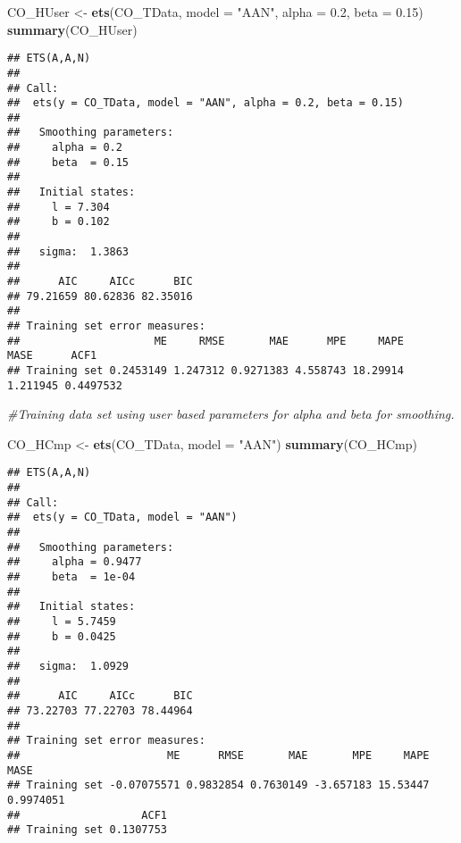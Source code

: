 \documentclass[
]{article}
\newenvironment{Shaded}{\begin{snugshade}}{\end{snugshade}}
\newcommand{\CommentTok}[1]{\textcolor[rgb]{0.56,0.35,0.01}{\textit{#1}}}
\newcommand{\DataTypeTok}[1]{\textcolor[rgb]{0.13,0.29,0.53}{#1}}
\newcommand{\FloatTok}[1]{\textcolor[rgb]{0.00,0.00,0.81}{#1}}
\newcommand{\KeywordTok}[1]{\textcolor[rgb]{0.13,0.29,0.53}{\textbf{#1}}}
\newcommand{\NormalTok}[1]{#1}
\newcommand{\StringTok}[1]{\textcolor[rgb]{0.31,0.60,0.02}{#1}}
\begin{document}
\begin{Shaded}
\begin{Highlighting}[]
\NormalTok{CO_HUser <-}\StringTok{ }\KeywordTok{ets}\NormalTok{(CO_TData, }\DataTypeTok{model =} \StringTok{"AAN"}\NormalTok{, }\DataTypeTok{alpha =} \FloatTok{0.2}\NormalTok{, }\DataTypeTok{beta =} \FloatTok{0.15}\NormalTok{)}
\KeywordTok{summary}\NormalTok{(CO_HUser)}
\end{Highlighting}
\end{Shaded}

\begin{verbatim}
## ETS(A,A,N) 
## 
## Call:
##  ets(y = CO_TData, model = "AAN", alpha = 0.2, beta = 0.15) 
## 
##   Smoothing parameters:
##     alpha = 0.2 
##     beta  = 0.15 
## 
##   Initial states:
##     l = 7.304 
##     b = 0.102 
## 
##   sigma:  1.3863
## 
##      AIC     AICc      BIC 
## 79.21659 80.62836 82.35016 
## 
## Training set error measures:
##                     ME     RMSE       MAE      MPE     MAPE     MASE      ACF1
## Training set 0.2453149 1.247312 0.9271383 4.558743 18.29914 1.211945 0.4497532
\end{verbatim}

\begin{Shaded}
\begin{Highlighting}[]
\CommentTok{#Training data set using user based parameters for alpha and beta for smoothing.}
\end{Highlighting}
\end{Shaded}

\begin{Shaded}
\begin{Highlighting}[]
\NormalTok{CO_HCmp <-}\StringTok{ }\KeywordTok{ets}\NormalTok{(CO_TData, }\DataTypeTok{model =} \StringTok{"AAN"}\NormalTok{)}
\KeywordTok{summary}\NormalTok{(CO_HCmp)}
\end{Highlighting}
\end{Shaded}

\begin{verbatim}
## ETS(A,A,N) 
## 
## Call:
##  ets(y = CO_TData, model = "AAN") 
## 
##   Smoothing parameters:
##     alpha = 0.9477 
##     beta  = 1e-04 
## 
##   Initial states:
##     l = 5.7459 
##     b = 0.0425 
## 
##   sigma:  1.0929
## 
##      AIC     AICc      BIC 
## 73.22703 77.22703 78.44964 
## 
## Training set error measures:
##                       ME      RMSE       MAE       MPE     MAPE      MASE
## Training set -0.07075571 0.9832854 0.7630149 -3.657183 15.53447 0.9974051
##                   ACF1
## Training set 0.1307753
\end{verbatim}
\end{document}
